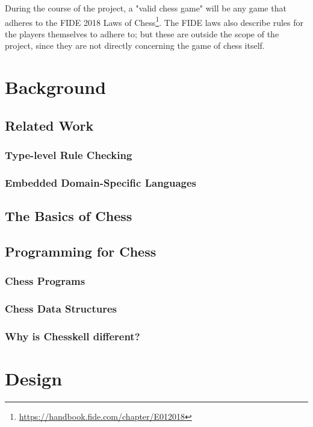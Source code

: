 \documentclass[12pt, a4paper, bibliography=totocnumbered]{scrreprt}
\begin{document}
During the course of the project, a "valid chess game" will be any game that adheres to the FIDE 2018 Laws of Chess\footnote{\url{https://handbook.fide.com/chapter/E012018}}. The FIDE laws also describe rules for the players themselves to adhere to; but these are outside the scope of the project, since they are not directly concerning the game of chess itself.

\part{Background}

\chapter{Related Work}

\section{Type-level Rule Checking}

\section{Embedded Domain-Specific Languages}

\chapter{The Basics of Chess}

\chapter{Programming for Chess}

\section{Chess Programs}

\section{Chess Data Structures}

\section{Why is Chesskell different?}


\part{Design}
\end{document}
